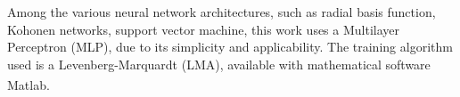 \documentclass[10pt,fleqn,a4paper]{article}
\newcommand{\reg}{\textsuperscript{\textregistered}}
\begin{document}
Among the various neural network architectures, such as radial basis function,
Kohonen networks, support vector machine, this work uses a Multilayer Perceptron
(MLP), due to its simplicity and applicability. The training algorithm used is a
Levenberg-Marquardt (LMA), available with mathematical software Matlab\reg.

\end{document}
